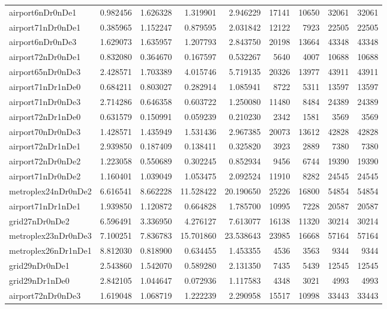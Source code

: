 \begin{longtable}{|l|r|r|r|r|r|r|r|r|}
airport6nDr0nDe1 & 0.982456 & 1.626328 & 1.319901 & 2.946229 & 17141 & 10650 & 32061 & 32061 \\
airport71nDr0nDe1 & 0.385965 & 1.152247 & 0.879595 & 2.031842 & 12122 & 7923 & 22505 & 22505 \\
airport6nDr0nDe3 & 1.629073 & 1.635957 & 1.207793 & 2.843750 & 20198 & 13664 & 43348 & 43348 \\
airport72nDr0nDe1 & 0.832080 & 0.364670 & 0.167597 & 0.532267 & 5640 & 4007 & 10688 & 10688 \\
airport65nDr0nDe3 & 2.428571 & 1.703389 & 4.015746 & 5.719135 & 20326 & 13977 & 43911 & 43911 \\
airport71nDr1nDe0 & 0.684211 & 0.803027 & 0.282914 & 1.085941 & 8722 & 5311 & 13597 & 13597 \\
airport71nDr0nDe3 & 2.714286 & 0.646358 & 0.603722 & 1.250080 & 11480 & 8484 & 24389 & 24389 \\
airport72nDr1nDe0 & 0.631579 & 0.150991 & 0.059239 & 0.210230 & 2342 & 1581 & 3569 & 3569 \\
airport70nDr0nDe3 & 1.428571 & 1.435949 & 1.531436 & 2.967385 & 20073 & 13612 & 42828 & 42828 \\
airport72nDr1nDe1 & 2.939850 & 0.187409 & 0.138411 & 0.325820 & 3923 & 2889 & 7380 & 7380 \\
airport72nDr0nDe2 & 1.223058 & 0.550689 & 0.302245 & 0.852934 & 9456 & 6744 & 19390 & 19390 \\
airport71nDr0nDe2 & 1.160401 & 1.039049 & 1.053475 & 2.092524 & 11910 & 8282 & 24545 & 24545 \\
metroplex24nDr0nDe2 & 6.616541 & 8.662228 & 11.528422 & 20.190650 & 25226 & 16800 & 54854 & 54854 \\
airport71nDr1nDe1 & 1.939850 & 1.120872 & 0.664828 & 1.785700 & 10995 & 7228 & 20587 & 20587 \\
grid27nDr0nDe2 & 6.596491 & 3.336950 & 4.276127 & 7.613077 & 16138 & 11320 & 30214 & 30214 \\
metroplex23nDr0nDe3 & 7.100251 & 7.836783 & 15.701860 & 23.538643 & 23985 & 16668 & 57164 & 57164 \\
metroplex26nDr1nDe1 & 8.812030 & 0.818900 & 0.634455 & 1.453355 & 4536 & 3563 & 9344 & 9344 \\
grid29nDr0nDe1 & 2.543860 & 1.542070 & 0.589280 & 2.131350 & 7435 & 5439 & 12545 & 12545 \\
grid29nDr1nDe0 & 2.842105 & 1.044647 & 0.072936 & 1.117583 & 4348 & 3021 & 4993 & 4993 \\
airport72nDr0nDe3 & 1.619048 & 1.068719 & 1.222239 & 2.290958 & 15517 & 10998 & 33443 & 33443 \\

\end{longtable}
